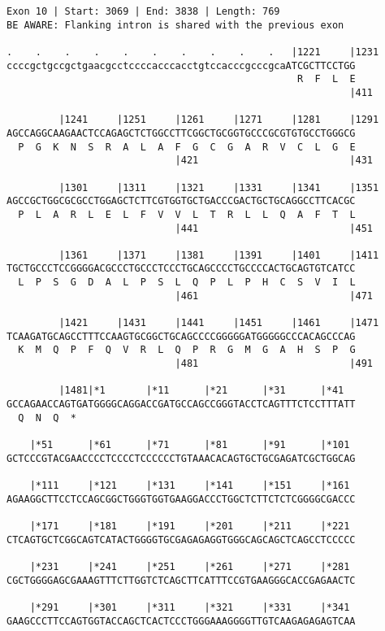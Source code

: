 \documentclass{article}
\begin{document}
\begin{Verbatim}
Exon 10 | Start: 3069 | End: 3838 | Length: 769
BE AWARE: Flanking intron is shared with the previous exon
 
.    .    .    .    .    .    .    .    .    .   |1221     |1231
ccccgctgccgctgaacgcctccccacccacctgtccacccgcccgcaATCGCTTCCTGG
                                                  R  F  L  E
                                                           |411
  
         |1241     |1251     |1261     |1271     |1281     |1291
AGCCAGGCAAGAACTCCAGAGCTCTGGCCTTCGGCTGCGGTGCCCGCGTGTGCCTGGGCG
  P  G  K  N  S  R  A  L  A  F  G  C  G  A  R  V  C  L  G  E
                             |421                          |431
  
         |1301     |1311     |1321     |1331     |1341     |1351
AGCCGCTGGCGCGCCTGGAGCTCTTCGTGGTGCTGACCCGACTGCTGCAGGCCTTCACGC
  P  L  A  R  L  E  L  F  V  V  L  T  R  L  L  Q  A  F  T  L
                             |441                          |451
  
         |1361     |1371     |1381     |1391     |1401     |1411
TGCTGCCCTCCGGGGACGCCCTGCCCTCCCTGCAGCCCCTGCCCCACTGCAGTGTCATCC
  L  P  S  G  D  A  L  P  S  L  Q  P  L  P  H  C  S  V  I  L
                             |461                          |471
  
         |1421     |1431     |1441     |1451     |1461     |1471
TCAAGATGCAGCCTTTCCAAGTGCGGCTGCAGCCCCGGGGGATGGGGGCCCACAGCCCAG
  K  M  Q  P  F  Q  V  R  L  Q  P  R  G  M  G  A  H  S  P  G
                             |481                          |491
  
         |1481|*1       |*11      |*21      |*31      |*41  
GCCAGAACCAGTGATGGGGCAGGACCGATGCCAGCCGGGTACCTCAGTTTCTCCTTTATT
  Q  N  Q  *   
  
    |*51      |*61      |*71      |*81      |*91      |*101 
GCTCCCGTACGAACCCCTCCCCTCCCCCCTGTAAACACAGTGCTGCGAGATCGCTGGCAG
  
    |*111     |*121     |*131     |*141     |*151     |*161 
AGAAGGCTTCCTCCAGCGGCTGGGTGGTGAAGGACCCTGGCTCTTCTCTCGGGGCGACCC
  
    |*171     |*181     |*191     |*201     |*211     |*221 
CTCAGTGCTCGGCAGTCATACTGGGGTGCGAGAGAGGTGGGCAGCAGCTCAGCCTCCCCC
  
    |*231     |*241     |*251     |*261     |*271     |*281 
CGCTGGGGAGCGAAAGTTTCTTGGTCTCAGCTTCATTTCCGTGAAGGGCACCGAGAACTC
  
    |*291     |*301     |*311     |*321     |*331     |*341 
GAAGCCCTTCCAGTGGTACCAGCTCACTCCCTGGGAAAGGGGTTGTCAAGAGAGAGTCAA
  

\end{Verbatim}
\end{document}
